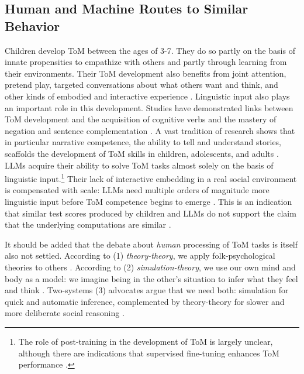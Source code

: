 \subsection{Human and Machine Routes to Similar Behavior}
Children develop ToM between the ages of 3-7. They do so partly on the basis of innate propensities to empathize with others and partly through learning from their environments. Their ToM development also benefits from joint attention, pretend play, targeted conversations about what others want and think, and other kinds of embodied and interactive experience \citep{apperly2011mindreaders}. Linguistic input also plays an important role in this development. Studies have demonstrated links between ToM development and the acquisition of cognitive verbs \citep{milligan2007language} and the mastery of negation \citep{devilliers2014role} and sentence complementation \citep{lohmann2003role}. A vast tradition of research shows that in particular narrative competence, the ability to tell and understand stories, scaffolds the development of ToM skills in children, adolescents, and adults \citep[e.g.]{hutto2008folk, vanduijn2016, nicolopoulou2017narrativity}. LLMs acquire their ability to solve ToM tasks almost solely on the basis of linguistic input.\footnote{The role of post-training in the development of ToM is largely unclear, although there are indications that supervised fine-tuning enhances ToM performance \citep{kouwenhoven2026traces}.} Their lack of interactive embedding in a real social environment is compensated with scale: LLMs need multiple orders of magnitude more linguistic input before ToM competence begins to emerge \citep{trott2023do, kouwenhoven2026traces}. This is an indication that similar test scores produced by children and LLMs do not support the claim that the underlying computations are similar \citep{hu2025reevaluatingtheorymindevaluation}. 

It should be added that the debate about \emph{human} processing of ToM tasks is itself also not settled. According to (1) \emph{theory-theory}, we apply folk-psychological theories to others \citep{gopnik1992child}. According to (2) \emph{simulation-theory}, we use our own mind and body as a model: we imagine being in the other's situation to infer what they feel and think \citep{goldman2006simulating}. Two-systems (3) advocates argue that we need both: simulation for quick and automatic inference, complemented by theory-theory for slower and more deliberate social reasoning \citep{apperly2009humans}. 

